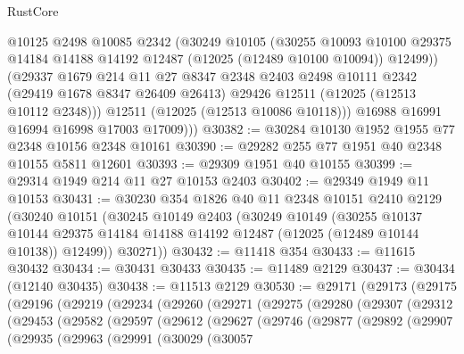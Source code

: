 \begin{lexlean}{RustCore}
\begin{coremodule}
            @10125
            @2498
            @10085
            @2342
            (@30249
              @10105
              (@30255
                @10093
                @10100
                @29375
                @14184
                @14188
                @14192
                @12487
                (@12025 (@12489 @10100 @10094))
                @12499))
            (@29337
              @1679
              @214
              @11
              @27
              @8347
              @2348
              @2403
              @2498
              @10111
              @2342
              (@29419 @1678 @8347 @26409 @26413)
              @29426
              @12511
              (@12025 (@12513 @10112 @2348)))
            @12511
            (@12025 (@12513 @10086 @10118)))
          @16988
          @16991
          @16994
          @16998
          @17003
          @17009)))
@30382 := @30284 @10130 @1952 @1955 @77 @2348 @10156 @2348 @10161
@30390 := @29282 @255 @77 @1951 @40 @2348 @10155 @5811 @12601
@30393 := @29309 @1951 @40 @10155
@30399 := @29314 @1949 @214 @11 @27 @10153 @2403
@30402 := @29349 @1949 @11 @10153
@30431 := @30230
    @354
    @1826
    @40
    @11
    @2348
    @10151
    @2410
    @2129
    (@30240
      @10151
      (@30245
        @10149
        @2403
        (@30249
          @10149
          (@30255
            @10137
            @10144
            @29375
            @14184
            @14188
            @14192
            @12487
            (@12025 (@12489 @10144 @10138))
            @12499))
        @30271))
@30432 := @11418 @354
@30433 := @11615 @30432
@30434 := @30431 @30433
@30435 := @11489 @2129
@30437 := @30434 (@12140 @30435)
@30438 := @11513 @2129
@30530 := @29171
    (@29173
      (@29175
        (@29196
          (@29219
            (@29234
              (@29260
                (@29271
                  (@29275
                    (@29280
                      (@29307
                        (@29312
                          (@29453
                            (@29582
                              (@29597
                                (@29612
                                  (@29627
                                    (@29746
                                      (@29877
                                        (@29892
                                          (@29907
                                            (@29935
                                              (@29963
                                                (@29991
                                                  (@30029
                                                    (@30057

\end{coremodule}
\end{lexlean}
